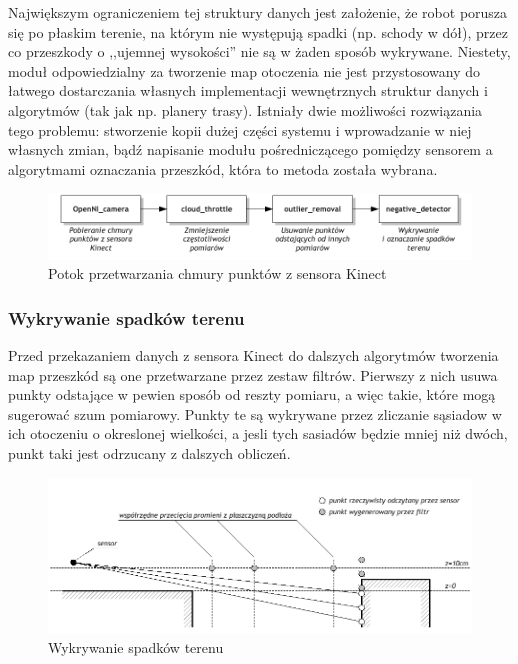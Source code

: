 Największym ograniczeniem tej struktury danych jest założenie, że robot porusza
się po płaskim terenie, na którym nie występują spadki (np. schody w dół), przez
co przeszkody o ,,ujemnej wysokości'' nie są w żaden sposób wykrywane. Niestety,
moduł odpowiedzialny za tworzenie map otoczenia nie jest przystosowany do
łatwego dostarczania własnych implementacji wewnętrznych struktur danych i
algorytmów (tak jak np. planery trasy). Istniały dwie możliwości
rozwiązania tego problemu: stworzenie kopii dużej części systemu i wprowadzanie
w niej własnych zmian, bądź napisanie modułu pośredniczącego pomiędzy sensorem a
algorytmami oznaczania przeszkód, która to metoda została wybrana.

\begin{figure}[htb!]
\centering
\includegraphics{../img/filtering}
\caption{Potok przetwarzania chmury punktów z sensora Kinect}
\label{fig:filtering}
\end{figure}

\subsubsection{Wykrywanie spadków terenu}

Przed przekazaniem danych z sensora Kinect do dalszych algorytmów tworzenia map
przeszkód są one przetwarzane przez zestaw filtrów. Pierwszy z nich usuwa punkty
odstające w pewien sposób od reszty pomiaru, a więc takie, które mogą sugerować
szum pomiarowy. Punkty te są wykrywane przez zliczanie sąsiadow w ich otoczeniu
o okreslonej wielkości, a jesli tych sasiadów będzie mniej niż dwóch, punkt taki
jest odrzucany z dalszych obliczeń.

\begin{figure}[htb!]
\centering
\includegraphics{../../Common/img/depresion}
\caption{Wykrywanie spadków terenu}
\label{fig:depresion}
\end{figure}

